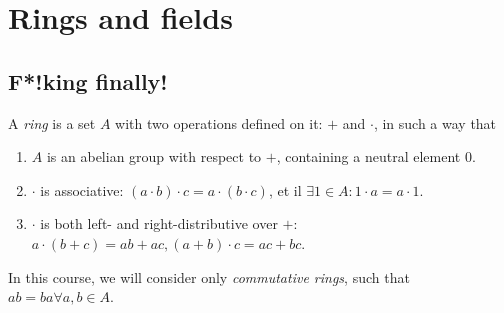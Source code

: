 \chapter{Rings and fields}

\section{F*!king finally!}

\begin{definition}
  A \emph{ring} is a set $A$ with two operations defined on it: $+$ and $\cdot$, in such a way that
  \begin{enumerate}
    \item $A$ is an abelian group with respect to $+$, containing a neutral element $0$. 
    \item $\cdot$ is associative: $(a \cdot b) \cdot c = a \cdot (b \cdot c)$, et il $\exists 1 \in A: 1 \cdot a = a \cdot 1$.
    \item  $\cdot$ is both left- and right-distributive over $+$: $a \cdot (b + c) = ab + ac,  (a + b) \cdot c = ac + bc$. 
  \end{enumerate}
\end{definition}

In this course, we will consider only \emph{commutative rings}, such that $ab = ba \forall a, b \in A$. 


